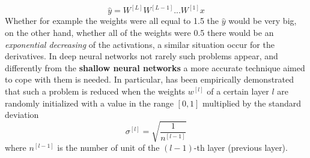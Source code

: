 \begin{equation*}
    \hat{y}=W^{[L]}W^{[L-1]}...W^{[1]}{x}
\end{equation*}
Whether for example the weights were all equal to 1.5 the $\hat{y}$ would be very big, on the other hand, whether all of the weights were 0.5 there would be an \textit{exponential decreasing} of the activations, a similar situation occur for the derivatives. In deep neural networks not rarely such problems appear, and differently from the \textbf{shallow neural networks} a more accurate technique aimed to cope with them is needed. In particular, has been empirically demonstrated that such a problem is reduced when the weights $w^{[l]}$ of a certain layer $l$ are randomly initialized with a value in the range $[0,1]$ multiplied by the standard deviation
\begin{equation*}
    \sigma^{[l]}=\sqrt{\frac{1}{n^{[l-1]}}}
\end{equation*}
where $n^{[l-1]}$ is the number of unit of the $(l-1)$-th layer (previous layer).


